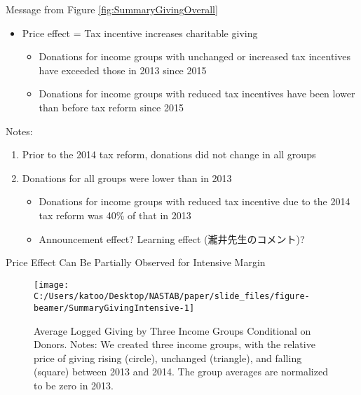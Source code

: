 \documentclass[
  ignorenonframetext,
  aspectratio=169,
]{beamer}
\providecommand{\tightlist}{%
  \setlength{\itemsep}{0pt}\setlength{\parskip}{0pt}}
\begin{document}
\begin{frame}{Message from Figure \ref{fig:SummaryGivingOverall}}
\protect\hypertarget{message-from-figure-reffigsummarygivingoverall}{}
\begin{itemize}
\tightlist
\item
  Price effect = Tax incentive increases charitable giving

  \begin{itemize}
  \tightlist
  \item
    Donations for income groups with unchanged or increased tax incentives have exceeded those in 2013 since 2015
  \item
    Donations for income groups with reduced tax incentives have been lower than before tax reform since 2015
  \end{itemize}
\end{itemize}

Notes:

\begin{enumerate}
\tightlist
\item
  Prior to the 2014 tax reform, donations did not change in all groups
\item
  Donations for all groups were lower than in 2013

  \begin{itemize}
  \tightlist
  \item
    Donations for income groups with reduced tax incentive due to the 2014 tax reform was 40\% of that in 2013
  \item
    Announcement effect? Learning effect (瀧井先生のコメント)?
  \end{itemize}
\end{enumerate}
\end{frame}

\begin{frame}{Price Effect Can Be Partially Observed for Intensive Margin}
\protect\hypertarget{price-effect-can-be-partially-observed-for-intensive-margin}{}
\begin{figure}[t]

{\centering \texttt{[image: C:/Users/katoo/Desktop/NASTAB/paper/slide\_files/figure-beamer/SummaryGivingIntensive-1]} 

}

\caption{Average Logged Giving by Three Income Groups Conditional on Donors. Notes: We created three income groups, with the relative price of giving rising (circle), unchanged (triangle), and falling (square) between 2013 and 2014. The group averages are normalized to be zero in 2013.}\label{fig:SummaryGivingIntensive}
\end{figure}
\end{frame}
\end{document}
